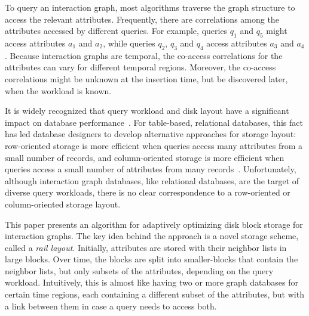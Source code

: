 To query an interaction graph, most algorithms traverse the graph structure to
access the relevant attributes.  Frequently, there are correlations among the
attributes accessed by different queries. For example, queries $q_1$ and $q_5$
might access attributes $a_1$ and $a_2$, while queries $q_2$, $q_3$ and $q_4$
access attributes $a_3$ and $a_4$. Because interaction graphs are temporal,
the co-access correlations for the attributes can vary for different temporal
regions.  Moreover, the co-access correlations might be unknown at the
insertion time, but be discovered later, when the workload is known.

It is widely recognized that query workload and disk layout have a significant
impact on database performance~\cite{alagiannis14,grund10,stonebraker05}.  For
table-based, relational databases, this fact has led database designers to
develop alternative approaches for storage layout: row-oriented storage is
more efficient when queries access many attributes from a small number of
records, and column-oriented storage is more efficient when queries access a
small number of attributes from many records~\cite{stonebraker05}. 
Unfortunately, although interaction graph databases, like relational
databases, are the target of diverse query workloads, there is no clear
correspondence to a row-oriented or column-oriented storage layout.


This paper presents an algorithm for adaptively optimizing disk block storage
for interaction graphs. The key idea behind the approach is a novel storage
scheme, called a \emph{rail layout}.  Initially, attributes are stored with
their neighbor lists in large blocks. Over time, the blocks are split into
smaller-blocks that contain the neighbor lists, but only subsets of the
attributes, depending on the query workload. Intuitively, this is almost like
having two or more graph databases for certain time regions, each containing a
different subset of the attributes, but with a link between them in case a
query needs to access both.




